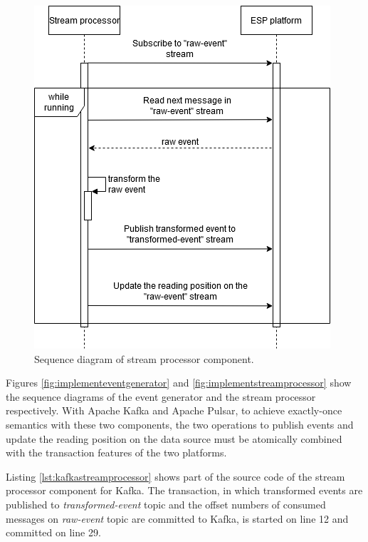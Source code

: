 \begin{figure}[ht!]
\begin{adjustwidth}{-1cm}{-1cm}
\begin{minipage}[t]{.48\linewidth}
		\includegraphics[width=\linewidth]{images/implement-stream-processor.png}
		\caption{Sequence diagram of stream processor component.}
		\label{fig:implementstreamprocessor1}
	\end{minipage}
	\end{adjustwidth}
\end{figure}
\fi
Figures \ref{fig:implementeventgenerator} and \ref{fig:implementstreamprocessor} show the sequence diagrams of the event generator and the stream processor respectively. With Apache Kafka and Apache Pulsar, to achieve exactly-once semantics with these two components,  the two operations to publish events and update the reading position on the data source must be atomically combined with the transaction features of the two platforms. 

Listing \ref{lst:kafkastreamprocessor} shows part of the source code of the stream processor component for Kafka. The transaction, in which transformed events are published to \emph{transformed-event} topic and the offset numbers of consumed messages on \emph{raw-event} topic are committed to Kafka, is started on line 12 and committed on line 29. 
\newpage

